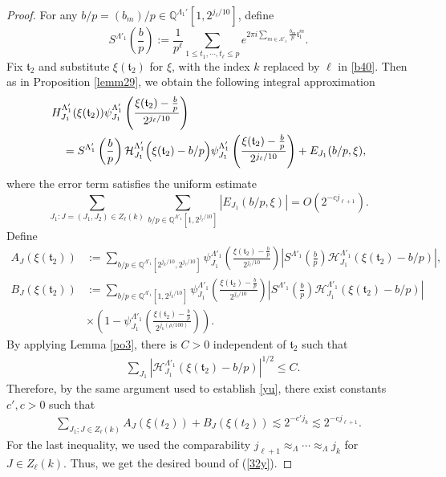 \documentclass[11 pt,letterpaper]{amsart}
\theoremstyle{plain}
\theoremstyle{definition}
\theoremstyle{remark} \theoremstyle{exam} \theoremstyle{ob}
\numberwithin{equation}{section}
\begin{document}
 
\begin{proof}
For any  $ b/p =(b_m)/p\in  \mathbb{Q}^{\Lambda_1'}[1,2^{j_\ell/10}]$, define $$S^{\Lambda'_1}(\frac{b}{p}):= \frac{1}{p^{\ell} }\sum_{1\le t_1,\cdots,t_\ell\le p}e^{2\pi i \sum_{m\in\Lambda'_{1}} \frac{b_{m}}{p} \mathfrak{t}_1^m}.$$ 
Fix $\mathfrak{t}_2$ and substitute $\xi(\mathfrak{t}_2)$ for $\xi$, with the index $k$ replaced by $\ell$ in \eqref{b40}.  Then as in  Proposition \ref{lemm29}, we obtain the following integral approximation  
\begin{align*}
&H^{\Lambda'_1}_{J_1}(\xi(\mathfrak{t}_2)) \psi^{\Lambda'_1}_{J_1}\left(\frac{\xi(\mathfrak{t}_2)-\frac{b}{p}}{2^{j_{\ell}/10}}\right)\\
&\quad=  S^{\Lambda'_1}\left(\frac{b}{p}\right)  \mathcal{H}^{\Lambda'_1}_{J_1}\Bigl(\xi(\mathfrak{t}_2)-b/p\Bigr)\psi^{\Lambda'_1}_{J_1}\left(\frac{\xi(\mathfrak{t}_2)-\frac{b}{p}}{2^{j_{\ell}/10}}\right)+ E_{J_1}(b/p,\xi),
\end{align*}
where   the error term satisfies the uniform estimate
\[
\sum_{J_1: J=(J_1,J_2)\in Z_\ell(k)}\sum_{b/p\in \mathbb{Q}^{\Lambda'_1}[1,2^{j_\ell/10}]}
   |E_{J_1}(b/p,\xi)|
   = O(2^{-c j_{\ell+1}}).
\]
Define
\begin{align*}
	A_J(\xi(\mathfrak{t}_2))&:=  \sum_{b/p\in  \mathbb{Q}^{\Lambda'_1}[2^{j_{k}/10},2^{j_{\ell}/10}]} \psi^{\Lambda'_1}_{J_1}\left(\frac{\xi(\mathfrak{t}_2)-\frac{b}{p}}{2^{j_{\ell}/10}}\right)\left|S^{\Lambda'_1}\left(\frac{b}{p}\right)\mathcal{H}^{\Lambda'_1}_{J_1}(\xi(\mathfrak{t}_2)-b/p)\right|,\\
 B_J(\xi(\mathfrak{t}_2))&:=  \sum_{b/p\in  \mathbb{Q}^{\Lambda'_1}[1,2^{j_k/10}]} \psi^{\Lambda'_1}_{J_1}\left(\frac{\xi(\mathfrak{t}_2)-\frac{b}{p}}{2^{j_{\ell}/10}}\right)\left|S^{\Lambda'_1}\left(\frac{b}{p}\right)\mathcal{H}^{\Lambda'_1}_{J_1}(\xi(\mathfrak{t}_2)-b/p)\right| \\
 &\times  \left(1- \psi^{\Lambda'_1}_{J_1}\left(\frac{\xi(\mathfrak{t}_2)-\frac{b}{p}}{2^{j_k(\rho/100)}}\right) \right).\end{align*} 
  By applying Lemma \ref{po3}, there is  $C>0$ independent of   $\mathfrak{t}_2 $ such that
 \begin{align*}
 	&\sum_{J_1 }|\mathcal{H}^{\Lambda'_1}_{J_1}(\xi(\mathfrak{t}_2)-b/p)|^{1/2}  \le C.
 \end{align*}
Therefore,   by the same argument used to establish \eqref{yu}, there exist constants $c',c>0$ such that
 \begin{align*}
 \sum_{J_1; J\in Z_\ell(k)}  A_J(\xi(t_2)) +  B_J(\xi(t_2)) 
 \lesssim 2^{-c' j_{k}}   \lesssim  2^{-c j_{\ell+1}}.
 \end{align*}
For the last inequality, we used the comparability
$
j_{\ell+1}\approx_\Lambda\cdots\approx_\Lambda j_k
$
for $J\in Z_\ell(k)$. Thus, we   get the desired bound of (\ref{32y}).
 \end{proof}
\end{document}
